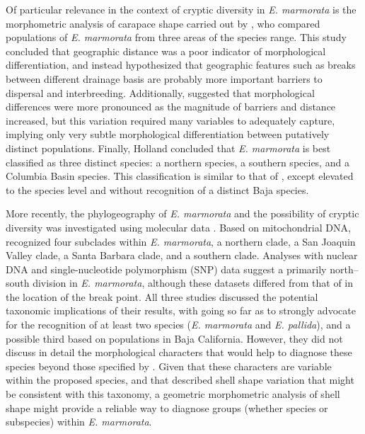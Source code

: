 \documentclass[12pt,letterpaper]{article}
\begin{document}
Of particular relevance in the context of cryptic diversity in \textit{E. marmorata} is the morphometric analysis of carapace shape carried out by \citet{Holland1992}, who compared populations of \textit{E. marmorata} from three areas of the species range. This study concluded that geographic distance was a poor indicator of morphological differentiation, and instead hypothesized that geographic features such as breaks between different drainage basis are probably more important barriers to dispersal and interbreeding. Additionally, \citet{Holland1992} suggested that morphological differences were more pronounced as the magnitude of barriers and distance increased, but this variation required many variables to adequately capture, implying only very subtle morphological differentiation between putatively distinct populations. Finally, Holland concluded that \textit{E. marmorata} is best classified as three distinct species: a northern species, a southern species, and a Columbia Basin species. This classification is similar to that of \citet{Seeliger1945}, except elevated to the species level and without recognition of a distinct Baja species. 

More recently, the phylogeography of \textit{E. marmorata} and the possibility of cryptic diversity was investigated using molecular data \citep{Spinks2005,Spinks2010,Spinks2014}. Based on mitochondrial DNA, \citet{Spinks2005} recognized four subclades within \textit{E. marmorata}, a northern clade, a San Joaquin Valley clade, a Santa Barbara clade, and a southern clade. Analyses with nuclear DNA \citep{Spinks2010} and single-nucleotide polymorphism (SNP) data suggest a primarily north--south division in \textit{E. marmorata}, although these datasets differed from that of \citet{Spinks2005} in the location of the break point. All three studies discussed the potential taxonomic implications of their results, with \citet{Spinks2014} going so far as to strongly advocate for the recognition of at least two species (\emph{E. marmorata} and \emph{E. pallida}), and a possible third based on populations in Baja California. However, they did not discuss in detail the morphological characters that would help to diagnose these species beyond those specified by \citet{Seeliger1945}. Given that these characters are variable within the proposed species, and that \citet{Holland1992} described shell shape variation that might be consistent with this taxonomy, a geometric morphometric analysis of shell shape might provide a reliable way to diagnose groups (whether species or subspecies) within \textit{E. marmorata}.
\end{document}
